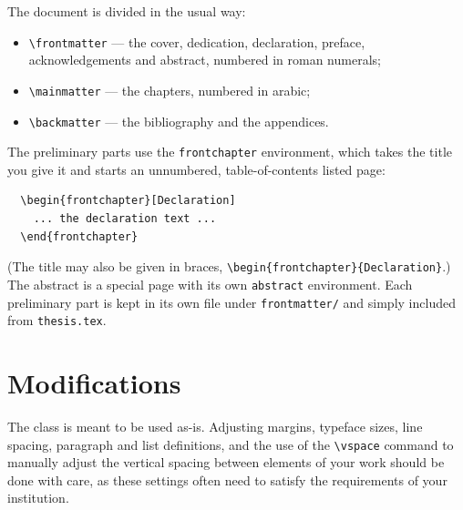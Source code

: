 The document is divided in the usual way:
\begin{itemize}
\item \verb|\frontmatter| --- the cover, dedication, declaration, preface,
  acknowledgements and abstract, numbered in roman numerals;
\item \verb|\mainmatter| --- the chapters, numbered in arabic;
\item \verb|\backmatter| --- the bibliography and the appendices.
\end{itemize}
The preliminary parts use the \verb|frontchapter| environment, which
takes the title you give it and starts an unnumbered, table-of-contents
listed page:
\begin{verbatim}
  \begin{frontchapter}[Declaration]
    ... the declaration text ...
  \end{frontchapter}
\end{verbatim}
(The title may also be given in braces, \verb|\begin{frontchapter}{Declaration}|.)
The abstract is a special page with its own \verb|abstract| environment.
Each preliminary part is kept in its own file under \texttt{frontmatter/}
and simply included from \texttt{thesis.tex}.

\section{Modifications}
\label{sec:modifications}

The class is meant to be used as-is. Adjusting margins, typeface sizes,
line spacing, paragraph and list definitions, and the use of the
\verb|\vspace| command to manually adjust the vertical spacing between
elements of your work should be done with care, as these settings often
need to satisfy the requirements of your institution.
